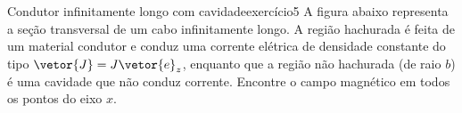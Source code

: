 \begin{exercício}{Condutor infinitamente longo com cavidade}{exercício5}
    A figura abaixo representa a seção transversal de um cabo infinitamente longo. A região hachurada é feita de um material condutor e conduz uma corrente elétrica de densidade constante do tipo \(\vetor{J} = J\vetor{e}_z\), enquanto que a região não hachurada (de raio \(b\)) é uma cavidade que não conduz corrente. Encontre o campo magnético em todos os pontos do eixo \(x\).
    \begin{center}
    \end{center}
\end{exercício}
